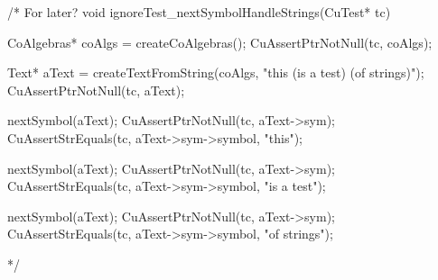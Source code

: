 /* For later?
void ignoreTest_nextSymbolHandleStrings(CuTest* tc) {
  CoAlgebras* coAlgs = createCoAlgebras();
  CuAssertPtrNotNull(tc, coAlgs);

  Text* aText = createTextFromString(coAlgs, "this (is a test) (of strings)");
  CuAssertPtrNotNull(tc, aText);

  nextSymbol(aText);
  CuAssertPtrNotNull(tc, aText->sym);
  CuAssertStrEquals(tc, aText->sym->symbol, "this");

  nextSymbol(aText);
  CuAssertPtrNotNull(tc, aText->sym);
  CuAssertStrEquals(tc, aText->sym->symbol, "is a test");

  nextSymbol(aText);
  CuAssertPtrNotNull(tc, aText->sym);
  CuAssertStrEquals(tc, aText->sym->symbol, "of strings");

}
*/
\stoptyping